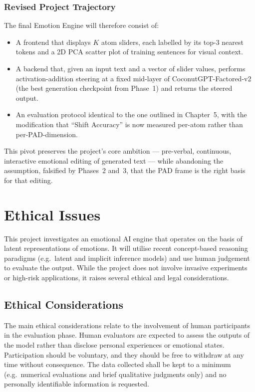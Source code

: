 \documentclass[12pt,twoside]{report}
\begin{document}
\subsection{Revised Project Trajectory}

The final Emotion Engine will therefore consist of:
\begin{itemize}
    \item A frontend that displays $K$ atom sliders, each labelled by its top-3 nearest tokens and a 2D PCA scatter plot of training sentences for visual context.
    \item A backend that, given an input text and a vector of slider values, performs activation-addition steering at a fixed mid-layer of CoconutGPT-Factored-v2 (the best generation checkpoint from Phase~1) and returns the steered output.
    \item An evaluation protocol identical to the one outlined in Chapter~5, with the modification that ``Shift Accuracy'' is now measured per-atom rather than per-PAD-dimension.
\end{itemize}

This pivot preserves the project's core ambition --- pre-verbal, continuous, interactive emotional editing of generated text --- while abandoning the assumption, falsified by Phases~2 and~3, that the PAD frame is the right basis for that editing.

\chapter{Ethical Issues}

This project investigates an emotional AI engine that operates on the basis of latent representations of emotions. It will utilise recent concept-based reasoning paradigms (e.g.\ latent and implicit inference models) and use human judgement to evaluate the output. While the project does not involve invasive experiments or high-risk applications, it raises several ethical and legal considerations.

\section{Ethical Considerations}
The main ethical considerations relate to the involvement of human participants in the evaluation phase. Human evaluators are expected to assess the outputs of the model rather than disclose personal experiences or emotional states. Participation should be voluntary, and they should be free to withdraw at any time without consequence. The data collected shall be kept to a minimum (e.g.\ numerical evaluations and brief qualitative judgments only) and no personally identifiable information is requested.
\end{document}
